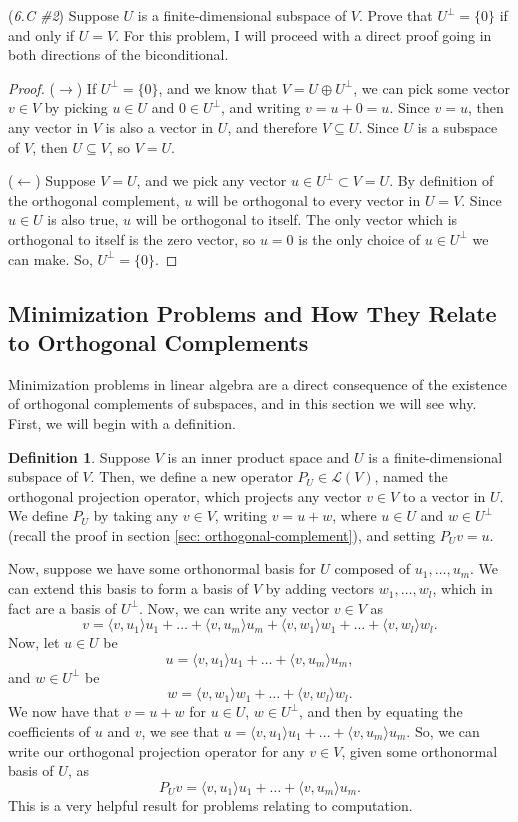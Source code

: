 \documentclass{article}
\renewcommand{\L}{\mathcal{L}}
\newcommand{\la}{\langle}
\newcommand{\ra}{\rangle}
\theoremstyle{definition}
\newtheorem{definition}{Definition}
\begin{document}
\begin{problem}{(\textit{6.C \#2}) Suppose $U$ is a finite-dimensional subspace of $V$. Prove that $U^\perp = \{0\}$ if and only if $U = V$.}
    For this problem, I will proceed with a direct proof going in both directions of the biconditional.
    \begin{proof}
        ($\rightarrow$) If $U^\perp = \{0\}$, and we know that $V = U \oplus U^\perp$, we can pick some vector $v \in V$ by picking $u \in U$ and $0 \in U^\perp$, and writing $v = u + 0 = u$. Since $v = u$, then any vector in $V$ is also a vector in $U$, and therefore $V \subseteq U$. Since $U$ is a subspace of $V$, then $U \subseteq V$, so $V = U$.

        ($\leftarrow$) Suppose $V = U$, and we pick any vector $u \in U^\perp \subset V = U$. By definition of the orthogonal complement, $u$ will be orthogonal to every vector in $U = V$. Since $u \in U$ is also true, $u$ will be orthogonal to itself. The only vector which is orthogonal to itself is the zero vector, so $u = 0$ is the only choice of $u \in U^\perp$ we can make. So, $U^\perp = \{0\}$.
    \end{proof}
\end{problem}

\subsection{Minimization Problems and How They Relate to Orthogonal Complements}

Minimization problems in linear algebra are a direct consequence of the existence of orthogonal complements of subspaces, and in this section we will see why. First, we will begin with a definition.
\begin{definition}
    Suppose $V$ is an inner product space and $U$ is a finite-dimensional subspace of $V$. Then, we define a new operator $P_U \in \L(V)$, named the orthogonal projection operator, which projects any vector $v \in V$ to a vector in $U$. We define $P_U$ by taking any $v \in V$, writing $v = u + w$, where $u \in U$ and $w \in U^\perp$ (recall the proof in section \ref{sec: orthogonal-complement}), and setting $P_Uv = u$.
\end{definition}
Now, suppose we have some orthonormal basis for $U$ composed of $u_1, \dots, u_m$. We can extend this basis to form a basis of $V$ by adding vectors $w_1, \dots, w_l$, which in fact are a basis of $U^\perp$. Now, we can write any vector $v \in V$ as $$v = \la v, u_1 \ra u_1 + \dots + \la v, u_m \ra u_m + \la v, w_1 \ra w_1 + \dots + \la v, w_l \ra w_l.$$ Now, let $u \in U$ be $$u = \la v, u_1 \ra u_1 + \dots + \la v, u_m \ra u_m,$$ and $w \in U^\perp$ be $$w = \la v, w_1 \ra w_1 + \dots + \la v, w_l \ra w_l.$$ We now have that $v = u + w$ for $u \in U$, $w \in U^\perp$, and then by equating the coefficients of $u$ and $v$, we see that $u = \la v, u_1 \ra u_1 + \dots + \la v, u_m \ra u_m$. So, we can write our orthogonal projection operator for any $v \in V$, given some orthonormal basis of $U$, as $$P_Uv = \la v, u_1 \ra u_1 + \dots + \la v, u_m \ra u_m.$$ This is a very helpful result for problems relating to computation.
\end{document}
